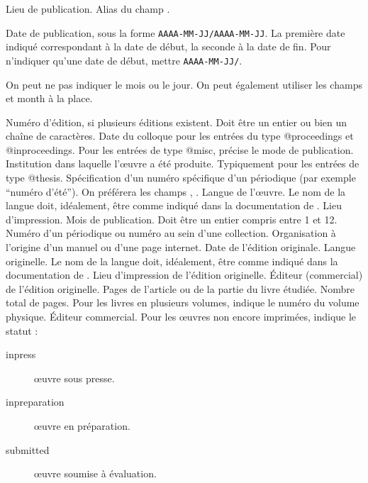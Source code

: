 \begin{fieldlist}
	
	Lieu de publication. Alias du champ .	
   	
	Date de publication, sous la forme \verb|AAAA-MM-JJ/AAAA-MM-JJ|.
	La première date indiqué correspondant à la date de début, la seconde à la date de fin. Pour n'indiquer qu'une date de début, mettre \verb|AAAA-MM-JJ/|. 
	
	On peut ne pas indiquer le mois ou le jour. On peut également utiliser les champs  et {month} à la place. 
	
	Numéro d'édition, si plusieurs éditions existent. Doit être un entier ou bien un chaîne de caractères.				
   	 Date du colloque pour les entrées du type @proceedings et @inproceedings. 
	 Pour les entrées de type @misc, précise le mode de publication.
   	 Institution dans laquelle l'œuvre a été produite. Typiquement pour les entrées de type @thesis. 
   	 Spécification d'un numéro spécifique d'un périodique (par exemple \enquote{numéro d'été}). On préférera les champs , .	
   	 Langue de l'œuvre. Le nom de la langue doit, idéalement, être comme indiqué dans la documentation de .					
   	 Lieu d'impression.  					
   	 Mois de publication. Doit être un entier compris entre 1 et 12. 
   	 Numéro d'un périodique ou numéro au sein d'une collection. 	
   	 Organisation à l'origine d'un manuel ou d'une page internet.	
   	 Date de l'édition originale.						
   	 Langue originelle. Le nom de la langue doit, idéalement, être comme indiqué dans la documentation de . 
   	 Lieu d'impression de l'édition originelle.		
   	 Éditeur (commercial) de l'édition originelle.		
	 Pages de l'article ou de la partie du livre étudiée. 
	 Nombre total de pages.
   	 Pour les livres en plusieurs volumes, indique le numéro du volume physique. 
   	 Éditeur commercial.					
   	 Pour les œuvres non encore imprimées, indique le statut :
					\begin{description}
						\item[inpress]œuvre sous presse.
						\item[inpreparation]œuvre en préparation.
						\item[submitted]œuvre soumise à évaluation.
					\end{description}
					

\end{fieldlist}
